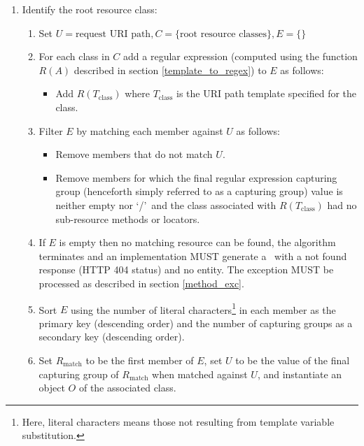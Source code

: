 \begin{enumerate}
\item Identify the root resource class:

\begin{enumerate}
\item Set $U=\mbox{request URI path}, C=\{\mbox{root resource classes}\}, E=\{\}$

\item For each class in $C$ add a regular expression (computed using the function $R(A)$ described in section \ref{template_to_regex}) to $E$ as follows:
\begin{itemize}
\item Add $R(T_{\mbox{class}})$ where $T_{\mbox{class}}$ is the URI path template specified for the class.
\end{itemize}

\item Filter $E$ by matching each member against $U$ as follows:
\begin{itemize}
\item Remove members that do not match $U$.
\item Remove members for which the final regular expression capturing group (henceforth simply referred to as a capturing group) value is neither empty nor \lq/\rq\ and the class associated with $R(T_{\mbox{class}})$ had no sub-resource methods or locators.
\end{itemize}

\item If $E$ is empty then no matching resource can be found, the algorithm terminates and an implementation MUST generate a \WebAppExc\ with a not found response (HTTP 404 status) and no entity. The exception MUST be processed as described in section \ref{method_exc}.

\item Sort $E$ using the number of literal characters\footnote{Here, literal characters means those not resulting from template variable substitution.} in each member as the primary key (descending order) and the number of capturing groups as a secondary key (descending order).

\item Set $R_{\mbox{match}}$ to be the first member of $E$, set $U$ to be the value of the final capturing group of $R_{\mbox{match}}$ when matched against $U$, and instantiate an object $O$ of the associated class.

\end{enumerate}


\end{enumerate}
